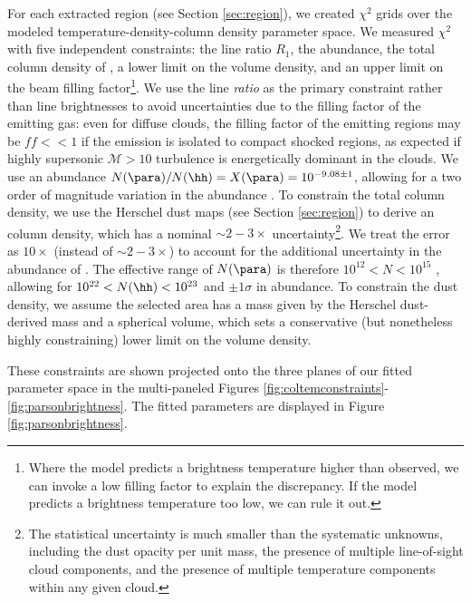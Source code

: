 For each extracted region (see Section \ref{sec:region}), we created $\chi^2$
grids over the modeled temperature-density-column density parameter space.  We
measured $\chi^2$ with five independent constraints: the line ratio $R_1$, the
\formaldehyde abundance, the total column density of \hh, a lower limit on the
\hh volume density, and an upper limit on the beam filling
factor\footnote{Where the model predicts a brightness temperature higher than
observed, we can invoke a low filling factor to explain the discrepancy.  If
the model predicts a brightness temperature too low,
we can rule it out.}.  We use the
line \emph{ratio} as the primary constraint rather than line brightnesses to
avoid uncertainties due to the filling factor of the emitting gas: even for
diffuse clouds, the filling factor of the emitting regions may be $ff<<1$ if
the emission is isolated to compact shocked regions, as expected if highly
supersonic $\mathcal{M}>10$ turbulence is energetically dominant in the clouds.
We use an abundance $N(\para)/N(\hh) = X(\para) =
10^{-9.08\pm1}$, allowing for a two order of magnitude variation in
the \formaldehyde abundance
\citep{Ginsburg2013a,Carey1998a,Wootten1978a,Mundy1987a}.  To constrain the
total column density, we use the Herschel dust maps (see Section
\ref{sec:region}) to derive an \hh column
density, which has a nominal $\sim2-3\times$ uncertainty\footnote{The
statistical uncertainty is much smaller than the systematic unknowns, including
the dust opacity per unit mass, the presence of multiple line-of-sight cloud
components, and the presence of multiple temperature components within any
given cloud.}.  We treat the error as $10\times$ (instead of $\sim2-3\times$)
to account for the additional uncertainty in the abundance of \para.
The effective range of $N(\para)$ is therefore $10^{12} < N < 10^{15}$ \persc,
allowing for $10^{22} < N(\hh) < 10^{23}$ \persc and $\pm1\sigma$ in abundance.
To
constrain the dust density, we assume the selected area has a mass given by the
Herschel dust-derived mass and a spherical volume, which sets a conservative
(but nonetheless highly constraining) lower limit on the volume density.

These constraints are shown projected onto the three planes of our fitted
parameter space in the multi-paneled Figures
\ref{fig:coltemconstraints}-\ref{fig:parsonbrightness}.  The fitted parameters
are displayed in Figure \ref{fig:parsonbrightness}.

